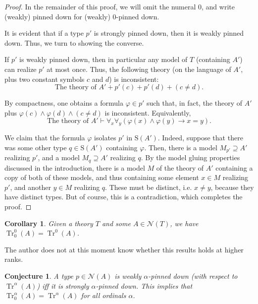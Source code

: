 \documentclass{article}
\newtheorem{corollary}[theorem]{Corollary}
\newtheorem{conjecture}[theorem]{Conjecture}
\theoremstyle{nonumberplain}
\newtheorem{proof}{Proof}
\newcommand{\calN}{\mathcal{N}}
\newcommand{\Stone}{\mathrm{S}}
\DeclareMathOperator{\Tr}{Tr}
\begin{document}
\begin{proof}
In the remainder of this proof, we will omit the numeral $0$, and write (weakly) pinned down for (weakly) $0$-pinned down.

It is evident that if a type $p'$ is strongly pinned down, then it is weakly pinned down. Thus, we turn to showing the converse.

If $p'$ is weakly pinned down, then in particular any model of $T$ (containing $A'$) can realize $p'$ at most once. Thus, the following theory (on the language of $A'$, plus two constant symbols $c$ and $d$) is inconsistent:
\begin{equation}
\text{The theory of $A'$} + p'(c) + p'(d) + (c \neq d).
\end{equation}

By compactness, one obtains a formula $\varphi \in p'$ such that, in fact, the theory of $A'$ plus $\varphi(c) \land \varphi(d) \land (c \neq d)$ is inconsistent. Equivalently,
\begin{equation}
\text{The theory of $A'$} \vdash \forall_x \forall_y (\varphi(x) \land \varphi(y) \rightarrow x = y).
\end{equation}

We claim that the formula $\varphi$ isolates $p'$ in $\Stone(A')$. Indeed, suppose that there was some other type $q \in \Stone(A')$ containing $\varphi$. Then, there is a model $M_{p'} \supseteq A'$ realizing $p'$, and a model $M_q \supseteq A'$ realizing $q$. By the model gluing properties discussed in the introduction, there is a model $M$ of the theory of $A'$ containing a copy of both of these models, and thus containing some element $x \in M$ realizing $p'$, and another $y \in M$ realizing $q$. These must be distinct, i.e. $x \neq y$, because they have distinct types. But of course, this is a contradiction, which completes the proof.
\end{proof}

\begin{corollary}
Given a theory $T$ and some $A \in \calN(T)$, we have $\Tr_0^0(A) = \Tr^0(A)$.
\end{corollary}

The author does not at this moment know whether this results holds at higher ranks.

\begin{conjecture}\label{conj:lemma}
A type $p \in \calN(A)$ is weakly $\alpha$-pinned down (with respect to $\Tr^\alpha(A)$) iff it is strongly $\alpha$-pinned down. This implies that $\Tr_0^\alpha(A) = \Tr^\alpha(A)$ for all ordinals $\alpha$.
\end{conjecture}
\end{document}
